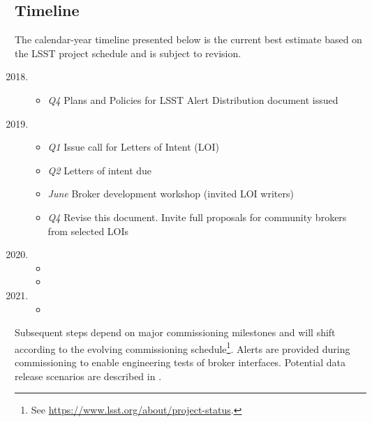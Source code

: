\subsection{Timeline}

The calendar-year timeline presented below is the current best estimate based on the LSST project schedule and is subject to revision.
{
	\renewcommand\labelenumi{\textbf{\theenumi}}
\begin{enumerate}
  \setcounter{enumi}{2017}
	\item \begin{itemize} %
		\item \textit{Q4} Plans and Policies for LSST Alert Distribution document issued
	\end{itemize}
	\item \begin{itemize}%
		\item \textit{Q1} Issue call for Letters of Intent (LOI)
		\item \textit{Q2} Letters of intent due
		\item \textit{June} Broker development workshop (invited LOI writers)
		\item \textit{Q4} Revise this document. Invite full proposals for community brokers from selected LOIs
		\end{itemize}
	\item \begin{itemize} %
		\item {}
		\item {}
	\end{itemize}
	\item \begin{itemize} %
		\item {}
		\end{itemize}
\end{enumerate}
}

Subsequent steps depend on major commissioning milestones and will shift according to the evolving commissioning schedule\footnote{See \url{https://www.lsst.org/about/project-status}.}.
Alerts are provided during commissioning to enable engineering tests of broker interfaces.
Potential data release scenarios are described in .

